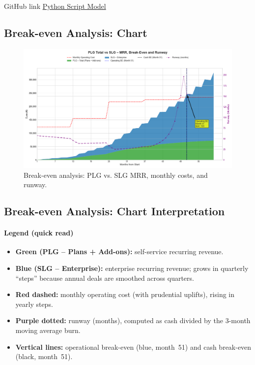 \documentclass[11pt, a4paper, oneside]{article}
\begin{document}
GitHub link \href{https://github.com/kuduk/intellyhub-businessplan/blob/main/breakeven.v2.02.py}{Python Script Model}

\newpage
\subsection{Break-even Analysis: Chart}
\begin{figure}[H]
    \centering 
    \includegraphics[width=\textwidth]{financial_projection.png}
    \caption{Break-even analysis: PLG vs. SLG MRR, monthly costs, and runway.}
    \label{fig:break_even_analysis}
\end{figure} 
\subsection{Break-even Analysis: Chart Interpretation}

\paragraph{Legend (quick read)}
\begin{itemize}
  \item \textbf{Green (PLG -- Plans + Add-ons):} self-service recurring revenue.
  \item \textbf{Blue (SLG -- Enterprise):} enterprise recurring revenue; grows in quarterly ``steps'' because annual deals are smoothed across quarters.
  \item \textbf{Red dashed:} monthly operating cost (with prudential uplifts), rising in yearly steps.
  \item \textbf{Purple dotted:} runway (months), computed as cash divided by the 3-month moving average burn.
  \item \textbf{Vertical lines:} operational break-even (blue, month~51) and cash break-even (black, month~51).
\end{itemize}
\end{document}
